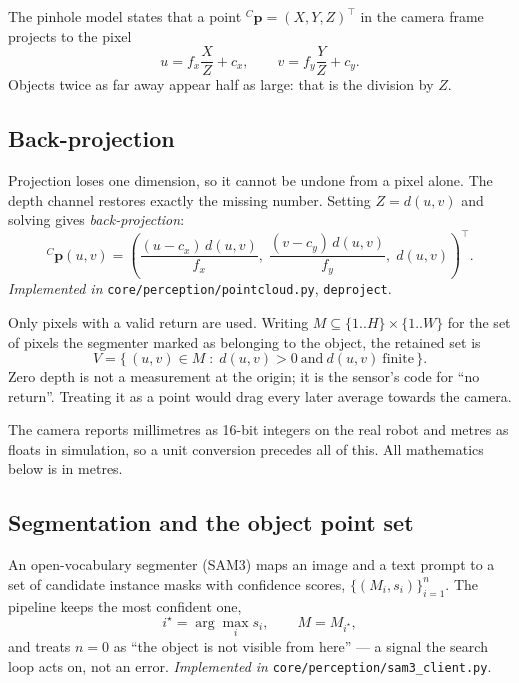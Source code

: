 \documentclass[11pt,a4paper]{article}
\begin{document}
The pinhole model states that a point ${}^{C}\mathbf{p} = (X,Y,Z)^\top$ in the
camera frame projects to the pixel
\begin{equation}
u = f_x \frac{X}{Z} + c_x, \qquad v = f_y \frac{Y}{Z} + c_y .
\end{equation}
Objects twice as far away appear half as large: that is the division by $Z$.

\subsection{Back-projection}

Projection loses one dimension, so it cannot be undone from a pixel alone. The
depth channel restores exactly the missing number. Setting $Z = d(u,v)$ and
solving gives \emph{back-projection}:
\begin{equation}
\boxed{\;
{}^{C}\mathbf{p}(u,v) =
\left(
\frac{(u - c_x)\, d(u,v)}{f_x},\;
\frac{(v - c_y)\, d(u,v)}{f_y},\;
d(u,v)
\right)^\top .
\;}
\label{eq:deproject}
\end{equation}
\textit{Implemented in} \texttt{core/perception/pointcloud.py}, \texttt{deproject}.

Only pixels with a valid return are used. Writing $M \subseteq \{1..H\}\times\{1..W\}$
for the set of pixels the segmenter marked as belonging to the object, the
retained set is
\begin{equation}
V = \{\, (u,v) \in M \;:\; d(u,v) > 0 \ \text{and}\ d(u,v) \ \text{finite} \,\}.
\end{equation}
Zero depth is not a measurement at the origin; it is the sensor's code for ``no
return''. Treating it as a point would drag every later average towards the
camera.

The camera reports millimetres as 16-bit integers on the real robot and metres as
floats in simulation, so a unit conversion precedes all of this. All mathematics
below is in metres.

\subsection{Segmentation and the object point set}

An open-vocabulary segmenter (SAM3) maps an image and a text prompt to a set of
candidate instance masks with confidence scores,
$\{(M_i, s_i)\}_{i=1}^{n}$. The pipeline keeps the most confident one,
\begin{equation}
i^\star = \arg\max_i s_i, \qquad M = M_{i^\star},
\end{equation}
and treats $n = 0$ as ``the object is not visible from here'' --- a signal the
search loop acts on, not an error.
\textit{Implemented in} \texttt{core/perception/sam3\_client.py}.
\end{document}
